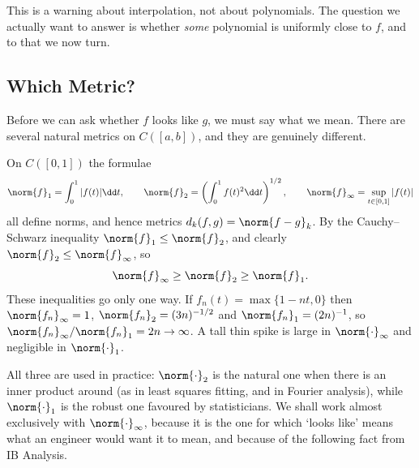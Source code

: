 \begin{center}
\end{center}

This is a warning about interpolation, not about polynomials. The question we actually want to answer is whether \emph{some} polynomial is uniformly close to $f$, and to that we now turn.

\subsection{Which Metric?}

Before we can ask whether $f$ looks like $g$, we must say what we mean. There are several natural metrics on $C([a,b])$, and they are genuinely different.

\begin{example}
	On $C([0,1])$ the formulae
	$$\norm{f}_1 = \int_0^1|f(t)|\dd t, \qquad \norm{f}_2 = \left(\int_0^1 f(t)^2\dd t\right)^{1/2}, \qquad \norm{f}_\infty = \sup_{t\in[0,1]}|f(t)|$$
	all define norms, and hence metrics $d_k(f,g) = \norm{f-g}_k$. By the Cauchy--Schwarz inequality $\norm{f}_1 \leq \norm{f}_2$, and clearly $\norm{f}_2\leq\norm{f}_\infty$, so
	$$\norm{f}_\infty \geq \norm{f}_2\geq \norm{f}_1.$$
	These inequalities go only one way. If $f_n(t) = \max\{1-nt,0\}$ then $\norm{f_n}_\infty = 1$, $\norm{f_n}_2 = (3n)^{-1/2}$ and $\norm{f_n}_1 = (2n)^{-1}$, so $\norm{f_n}_\infty/\norm{f_n}_1 = 2n \to \infty$. A tall thin spike is large in $\norm{\cdot}_\infty$ and negligible in $\norm{\cdot}_1$.
\end{example}

All three are used in practice: $\norm{\cdot}_2$ is the natural one when there is an inner product around (as in least squares fitting, and in Fourier analysis), while $\norm{\cdot}_1$ is the robust one favoured by statisticians. We shall work almost exclusively with $\norm{\cdot}_\infty$, because it is the one for which `looks like' means what an engineer would want it to mean, and because of the following fact from IB Analysis.

